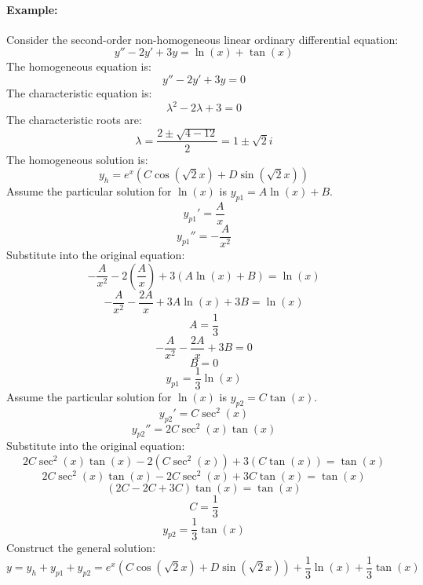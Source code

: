 \paragraph*{Example:}
Consider the second-order non-homogeneous linear ordinary differential equation:
\[y''-2y'+3y=\ln(x)+\tan(x)\]
The homogeneous equation is:
\[y''-2y'+3y=0\]
The characteristic equation is:
\[\lambda^2-2\lambda+3=0\]
The characteristic roots are:
\[\lambda=\frac{2\pm\sqrt{4-12}}{2}=1\pm\sqrt{2}i\]
The homogeneous solution is:
\[y_h=e^x(C\cos(\sqrt{2}x)+D\sin(\sqrt{2}x))\]
Assume the particular solution for $\ln(x)$ is $y_{p1}=A\ln(x)+B$.
\[y_{p1}'=\frac{A}{x}\]
\[y_{p1}''=-\frac{A}{x^2}\]
Substitute into the original equation:
\[-\frac{A}{x^2}-2\left(\frac{A}{x}\right)+3(A\ln(x)+B)=\ln(x)\]
\[-\frac{A}{x^2}-\frac{2A}{x}+3A\ln(x)+3B=\ln(x)\]
\[A=\frac{1}{3}\]
\[-\frac{A}{x^2}-\frac{2A}{x}+3B=0\]
\[B=0\]
\[y_{p1}=\frac{1}{3}\ln(x)\]
Assume the particular solution for $\ln(x)$ is $y_{p2}=C\tan(x)$.
\[y_{p2}'=C\sec^2(x)\]
\[y_{p2}''=2C\sec^2(x)\tan(x)\]
Substitute into the original equation:
\[2C\sec^2(x)\tan(x)-2(C\sec^2(x))+3(C\tan(x))=\tan(x)\]
\[2C\sec^2(x)\tan(x)-2C\sec^2(x)+3C\tan(x)=\tan(x)\]
\[(2C-2C+3C)\tan(x)=\tan(x)\]
\[C=\frac{1}{3}\]
\[y_{p2}=\frac{1}{3}\tan(x)\]
Construct the general solution:
\[y=y_h+y_{p1}+y_{p2}=e^x(C\cos(\sqrt{2}x)+D\sin(\sqrt{2}x))+\frac{1}{3}\ln(x)+\frac{1}{3}\tan(x)\]